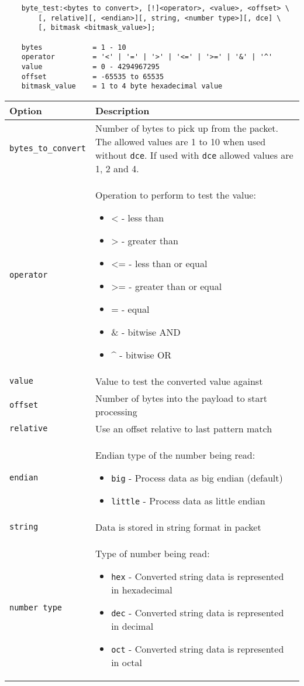 \documentclass[english]{report}
\begin{document}
\footnotesize
\begin{verbatim}
    byte_test:<bytes to convert>, [!]<operator>, <value>, <offset> \
        [, relative][, <endian>][, string, <number type>][, dce] \
        [, bitmask <bitmask_value>];

    bytes            = 1 - 10
    operator         = '<' | '=' | '>' | '<=' | '>=' | '&' | '^'
    value            = 0 - 4294967295
    offset           = -65535 to 65535
    bitmask_value    = 1 to 4 byte hexadecimal value
\end{verbatim}
\normalsize

\begin{tabular}{| l | p{4.5in} |}
\hline
{\bf Option} & {\bf Description}\\
\hline
\hline
\texttt{bytes\_to\_convert} & 

Number of bytes to pick up from the packet. The allowed values are 1 to 10 when 
used without \texttt{dce}. If used with \texttt{dce} allowed values are 1, 2 and 4.\\

\hline
\texttt{operator} & Operation to perform to test the value:
\begin{itemize}
\item \textless{} - less than
\item \textgreater{} - greater than
\item \textless{}= - less than or equal
\item \textgreater{}= - greater than or equal
\item = - equal
\item \& - bitwise AND
\item \textasciicircum{} - bitwise OR
\end{itemize}\\
\hline
\texttt{value} & Value to test the converted value against\\
\hline
\texttt{offset} & Number of bytes into the payload to start processing\\
\hline
\texttt{relative} & Use an offset relative to last pattern match\\
\hline
\texttt{endian} & Endian type of the number being read: 
\begin{itemize}
\item \texttt{big} - Process data as big endian (default)
\item \texttt{little} - Process data as little endian
\end{itemize}\\
\hline
\texttt{string} & Data is stored in string format in packet\\
\hline
\texttt{number type} & Type of number being read:
\begin{itemize}
\item \texttt{hex} - Converted string data is represented in hexadecimal
\item \texttt{dec} - Converted string data is represented in decimal
\item \texttt{oct} - Converted string data is represented in octal
\end{itemize}\\


\end{tabular}
\end{document}
